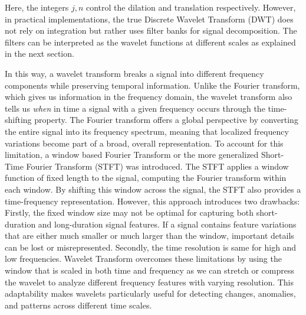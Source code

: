 Here, the integers $j,n$ control the dilation and translation respectively.  However, in practical implementations, the
true Discrete Wavelet Transform (DWT) does not rely on integration but rather uses filter banks for signal
decomposition. The filters can be interpreted as the wavelet functions at different scales as explained in the next
section.

In this way, a wavelet transform breaks a signal into different frequency components while preserving temporal
information. Unlike the Fourier transform, which gives us information in the frequency domain, the wavelet transform
also tells us {\em when} in time a signal with a given frequency occurs through the time-shifting property. The Fourier
transform offers a global perspective by converting the entire signal into its frequency spectrum, meaning that
localized frequency variations become part of a broad, overall representation. To account for this limitation, a window
based Fourier Transform or the more generalized Short-Time Fourier Transform (STFT) was introduced. The STFT applies a
window function of fixed length to the signal, computing the Fourier transform within each window. By shifting this
window across the signal, the STFT also provides a time-frequency representation. However, this approach introduces two
drawbacks: Firstly, the fixed window size may not be optimal for capturing both short-duration and long-duration signal
features. If a signal contains feature variations that are either much smaller or much larger than the window, important
details can be lost or misrepresented.  Secondly, the time resolution is same for high and low frequencies.  Wavelet
Transform overcomes these limitations by using the window that is scaled in both time and frequency as we can stretch or
compress the wavelet to analyze different frequency features with varying resolution. This adaptability makes wavelets
particularly useful for detecting changes, anomalies, and patterns across different time scales.
